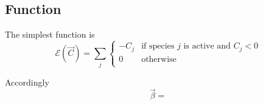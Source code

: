 \documentclass[aps]{revtex4}
\begin{document}
\subsection{Function}
The simplest function is
\begin{equation}
	\mathcal{E}\left(\vec{C}\right) = \sum_j
	\left\lbrace
	\begin{array}{cl}
	-C_j & \text{if species } j \text{ is active and } C_j<0\\
	0    & \text{otherwise}\\
	\end{array}
	\right.
\end{equation}

Accordingly
\begin{equation}
	\vec{\beta} = 
\end{equation}
\end{document}
